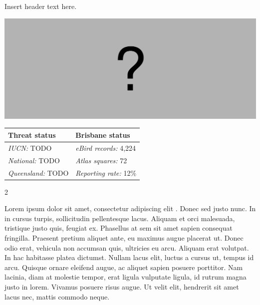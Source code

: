 \documentclass[12pt,openany,oneside]{book}
\let\origfigure\figure
\let\endorigfigure\endfigure
\renewenvironment{figure}[1][2] {
  \expandafter\origfigure\expandafter[H]
} {
  \endorigfigure
}
\let\Begin\begin
\let\End\end
\theoremstyle{definition}
\theoremstyle{definition}
\theoremstyle{definition}
\theoremstyle{remark}
\begin{document}

Insert header text here.

\begin{figure}
\centering
\includegraphics[width=\textwidth,keepaspectratio=true]{assets/misc/missing-profile.png}
\caption{Insert caption here.}
\end{figure}

\begin{tabu} to 
\toprule
Threat status & Brisbane status\\
\midrule
\textit{IUCN:} TODO & \textit{eBird records:} 4,224\\
\textit{National:} TODO & \textit{Atlas squares:} 72\\
\textit{Queensland:} TODO & \textit{Reporting rate:} 12\%\\
\bottomrule
\end{tabu} 
\vspace{0.15cm}

\Begin{multicols}{2}

Lorem ipsum dolor sit amet, consectetur adipiscing elit
\citep{rexample1, rexample2, rexample3}. Donec sed justo nunc. In in
cursus turpis, sollicitudin pellentesque lacus. Aliquam et orci
malesuada, tristique justo quis, feugiat ex. Phasellus at sem sit amet
sapien consequat fringilla. Praesent pretium aliquet ante, eu maximus
augue placerat ut. Donec odio erat, vehicula non accumsan quis,
ultricies eu arcu. Aliquam erat volutpat. In hac habitasse platea
dictumst. Nullam lacus elit, luctus a cursus ut, tempus id arcu. Quisque
ornare eleifend augue, ac aliquet sapien posuere porttitor. Nam lacinia,
diam at molestie tempor, erat ligula vulputate ligula, id rutrum magna
justo in lorem. Vivamus posuere risus augue. Ut velit elit, hendrerit
sit amet lacus nec, mattis commodo neque.

\End{multicols}

\clearpage
\end{document}
